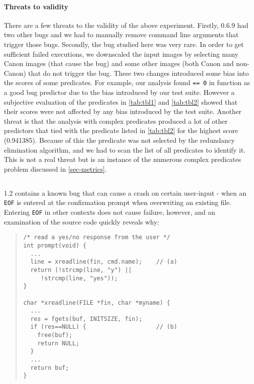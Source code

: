 \paragraph{Threats to validity}
There are a few threats to the validity of the above experiment.  Firstly,  0.6.9 had two other bugs and we had to manually remove command line arguments that trigger those bugs.  Secondly, the bug studied here was very rare.  In order to get sufficient failed executions, we downscaled the input images by selecting many Canon images (that cause the bug) and some other images (both Canon and non-Canon) that do not trigger the bug.  These two changes introduced some bias into the scores of some predicates.  For example, our analysis found  \texttt{== 0} in function  as a good bug predictor due to the bias introduced by our test suite.  However a subjective evaluation of the predicates in \autoref{tab:tbl1} and \autoref{tab:tbl2} showed that their scores were not affected by any bias introduced by the test suite.  Another threat is that the analysis with complex predicates produced a lot of other predictors that tied with the predicate listed in \autoref{tab:tbl2} for the highest score (0.941385).  Because of this the predicate was not selected by the redundancy elimination algorithm, and we had to scan the list of all predicates to identify it.  This is not a real threat but is an instance of the numerous complex predicates problem discussed in \autoref{sec-metrics}.

\subsection{\large\textbf{}}
\label{sec-ccrypt}
 1.2 contains a known bug that can cause a crash on certain user-input - when an \texttt{EOF} is entered at the confirmation prompt when overwriting an existing file.  Entering \texttt{EOF} in other contexts does not cause failure, however, and an examination of the source code quickly reveals why:
\begin{quote}
\small
\begin{verbatim}
/* read a yes/no response from the user */
int prompt(void) {
  ...
  line = xreadline(fin, cmd.name);    // (a)
  return (!strcmp(line, "y") ||
     !strcmp(line, "yes"));
}

char *xreadline(FILE *fin, char *myname) {
  ...
  res = fgets(buf, INITSIZE, fin);
  if (res==NULL) {                    // (b)
    free(buf);
    return NULL;
  }
  ...
  return buf;
}
\end{verbatim}
\end{quote}

